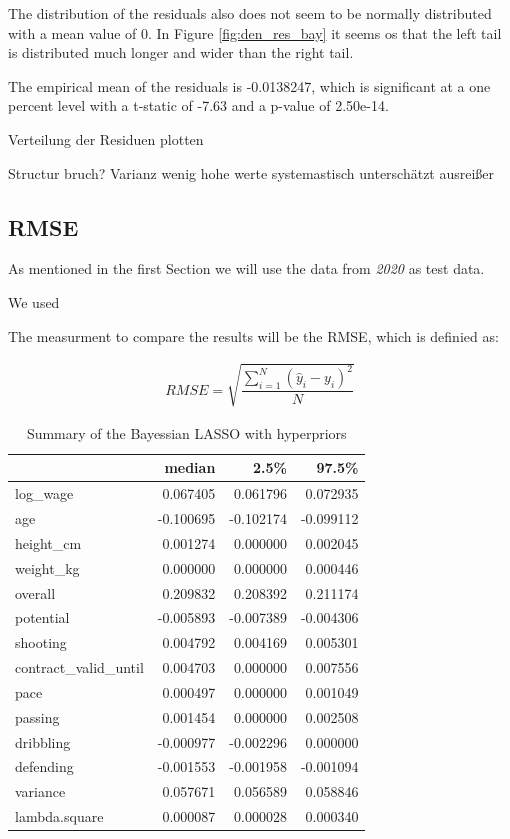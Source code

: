 \documentclass[12pt,a4paper]{article}
\begin{document}
The distribution of the residuals also does not seem to be normally
distributed with a mean value of 0. In Figure \ref{fig:den_res_bay} it
seems os that the left tail is distributed much longer and wider than
the right tail.

The empirical mean of the residuals is -0.0138247, which is significant
at a one percent level with a t-static of -7.63 and a p-value of
2.50e-14.

Verteilung der Residuen plotten

Structur bruch? Varianz wenig hohe werte systemastisch unterschätzt
ausreißer

\hypertarget{section-2}{%
\subsection{\texorpdfstring{\ac{RMSE}}{}}\label{section-2}}

As mentioned in the first Section we will use the data from \emph{2020}
as test data.

We used

The measurment to compare the results will be the \acf{RMSE}, which is
definied as:

\begin{align*} 
  RMSE = \sqrt{ \dfrac{ \displaystyle \sum_{i = 1}^{N} \left( \hat{y}_i  - y_i \right)^2} {N}    }
\end{align*}

\FloatBarrier
\begin{table}[!h]

\caption{\label{tab:sensity }\label{tab:sum_bay_hy_1} Summary of the  Bayessian LASSO with hyperpriors}
\centering
\begin{tabular}[t]{lrrr}
\toprule
  & median & 2.5\% & 97.5\%\\
\midrule
\rowcolor{gray!6}  log\_wage & 0.067405 & 0.061796 & 0.072935\\
age & -0.100695 & -0.102174 & -0.099112\\
\rowcolor{gray!6}  height\_cm & 0.001274 & 0.000000 & 0.002045\\
weight\_kg & 0.000000 & 0.000000 & 0.000446\\
\rowcolor{gray!6}  overall & 0.209832 & 0.208392 & 0.211174\\
potential & -0.005893 & -0.007389 & -0.004306\\
\rowcolor{gray!6}  shooting & 0.004792 & 0.004169 & 0.005301\\
contract\_valid\_until & 0.004703 & 0.000000 & 0.007556\\
\rowcolor{gray!6}  pace & 0.000497 & 0.000000 & 0.001049\\
passing & 0.001454 & 0.000000 & 0.002508\\
\rowcolor{gray!6}  dribbling & -0.000977 & -0.002296 & 0.000000\\
defending & -0.001553 & -0.001958 & -0.001094\\
\rowcolor{gray!6}  variance & 0.057671 & 0.056589 & 0.058846\\
lambda.square & 0.000087 & 0.000028 & 0.000340\\
\bottomrule
\end{tabular}
\end{table}
\FloatBarrier
\end{document}

